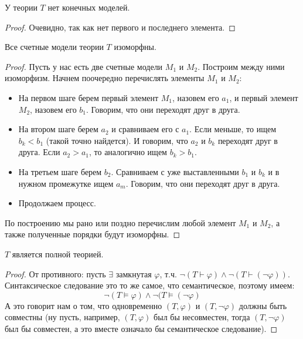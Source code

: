 \begin{example}
\begin{enumerate}
        \begin{lemma}
            У теории $T$ нет конечных моделей.
        \end{lemma}
        \begin{proof}
            Очевидно, так как нет первого и последнего элемента.
        \end{proof}
        \begin{lemma}
            Все счетные модели теории $T$ изоморфны.
        \end{lemma}
        \begin{proof}
            Пусть у нас есть две счетные модели $M_1$ и $M_2$. Построим между ними изоморфизм.
            Начнем поочередно перечислять элементы $M_1$ и $M_2$:\begin{itemize}
                \item На первом шаге берем первый элемент $M_1$, назовем его $a_1$, и первый элемент $M_2$, назовем его $b_1$. Говорим, что они переходят друг в друга.
                \item На втором шаге берем $a_2$ и сравниваем его с $a_1$. Если меньше, то ищем $b_k < b_1$ (такой точно найдется). И говорим, что $a_2$ и $b_k$ переходят друг в друга. Если $a_2 > a_1$, то аналогично ищем $b_k > b_1$.
                \item На третьем шаге берем $b_2$. Сравниваем с уже выставленными $b_1$ и $b_k$ и в нужном промежутке ищем $a_m$. Говорим, что они переходят друг в друга.
                \item Продолжаем процесс.
            \end{itemize}
            По построению мы рано или поздно перечислим любой элемент $M_1$ и $M_2$, а также полученные порядки будут изоморфны.
        \end{proof}
        \begin{lemma}
            $T$ является полной теорией.
        \end{lemma}
        \begin{proof}
            От противного: пусть $\exists$ замкнутая $\varphi$, т.ч. $\lnot(T \vdash \varphi) \land \lnot(T \vdash (\lnot \varphi))$. Синтаксическое следование это то же самое, что семантическое, поэтому имеем: \[ \lnot(T \vDash \varphi) \land \lnot(T \vDash (\lnot \varphi)\]
            А это говорит нам о том, что одновременно $(T, \varphi)$ и $(T, \lnot \varphi)$ должны быть совместны (ну пусть, например, $(T, \varphi)$ был бы несовместен, тогда $(T, \lnot \varphi)$ был бы совместен, а это вместе означало бы семантическое следование).


\end{proof}
\end{enumerate}
\end{example}
